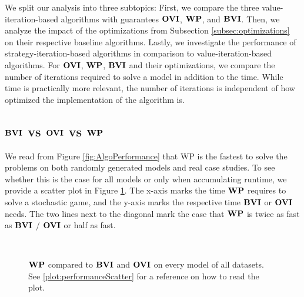We split our analysis into three subtopics: 
First, we compare the three value-iteration-based algorithms with guarantees $\mathbf{OVI}$, $\mathbf{WP}$, and $\mathbf{BVI}$. 
Then, we analyze the impact of the optimizations from Subsection \ref{subsec:optimizations} on their respective baseline algorithms.
Lastly, we investigate the performance of strategy-iteration-based algorithms in comparison to value-iteration-based algorithms.
For $\mathbf{OVI}$, $\mathbf{WP}$, $\mathbf{BVI}$ and their optimizations, we compare the number of iterations required to solve a model in addition to the time.
While time is practically more relevant, the number of iterations is independent of how optimized the implementation of the algorithm is.
\FloatBarrier

\subsection{$\mathbf{BVI}$ vs $\mathbf{OVI}$ vs $\mathbf{WP}$}
We read from Figure \ref{fig:AlgoPerformance} that WP is the fastest to solve the problems on both randomly generated models and real case studies.
To see whether this is the case for all models or only when accumulating runtime, we provide a scatter plot in Figure \ref{fig:WPvsBVIvsOVI}.
The x-axis marks the time $\mathbf{WP}$ requires to solve a stochastic game, and the y-axis marks the respective time $\mathbf{BVI}$ or $\mathbf{OVI}$ needs.
The two lines next to the diagonal mark the case that $\mathbf{WP}$ is twice as fast as $\mathbf{BVI}$ / $\mathbf{OVI}$ or half as fast.

\begin{figure}[h!]
    \centering
    \
    \caption{$\mathbf{WP}$ compared to $\mathbf{BVI}$ and $\mathbf{OVI}$ on every model of all datasets. See \ref{plot:performanceScatter} for a reference on how to read the plot.}%
    \label{fig:WPvsBVIvsOVI}%
    \end{figure}
\FloatBarrier


